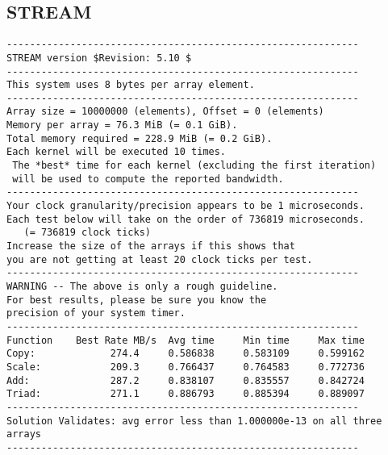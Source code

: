 \subsection{STREAM}\label{rpi-stream}

\begin{verbatim}
-------------------------------------------------------------
STREAM version $Revision: 5.10 $
-------------------------------------------------------------
This system uses 8 bytes per array element.
-------------------------------------------------------------
Array size = 10000000 (elements), Offset = 0 (elements)
Memory per array = 76.3 MiB (= 0.1 GiB).
Total memory required = 228.9 MiB (= 0.2 GiB).
Each kernel will be executed 10 times.
 The *best* time for each kernel (excluding the first iteration)
 will be used to compute the reported bandwidth.
-------------------------------------------------------------
Your clock granularity/precision appears to be 1 microseconds.
Each test below will take on the order of 736819 microseconds.
   (= 736819 clock ticks)
Increase the size of the arrays if this shows that
you are not getting at least 20 clock ticks per test.
-------------------------------------------------------------
WARNING -- The above is only a rough guideline.
For best results, please be sure you know the
precision of your system timer.
-------------------------------------------------------------
Function    Best Rate MB/s  Avg time     Min time     Max time
Copy:             274.4     0.586838     0.583109     0.599162
Scale:            209.3     0.766437     0.764583     0.772736
Add:              287.2     0.838107     0.835557     0.842724
Triad:            271.1     0.886793     0.885394     0.889097
-------------------------------------------------------------
Solution Validates: avg error less than 1.000000e-13 on all three arrays
-------------------------------------------------------------
\end{verbatim}
\endinput 